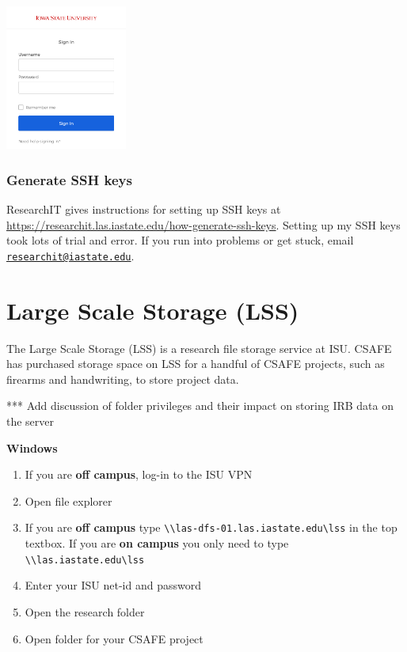 \documentclass[
]{book}
\providecommand{\tightlist}{%
  \setlength{\itemsep}{0pt}\setlength{\parskip}{0pt}}
\begin{document}
\begin{enumerate}
  \includegraphics[width=0.3\textwidth,height=0.3\textheight]{images/isu_login.png}
\end{enumerate}

\hypertarget{ssh-keys}{%
\subsection{Generate SSH keys}\label{ssh-keys}}

ResearchIT gives instructions for setting up SSH keys at \url{https://researchit.las.iastate.edu/how-generate-ssh-keys}. Setting up my SSH keys took lots of trial and error. If you run into problems or get stuck, email \href{mailto:researchit@iastate.edu}{\nolinkurl{researchit@iastate.edu}}.

\hypertarget{lss}{%
\chapter{Large Scale Storage (LSS)}\label{lss}}

The Large Scale Storage (LSS) is a research file storage service at ISU. CSAFE has purchased storage space on LSS for a handful of CSAFE projects, such as firearms and handwriting, to store project data.

*** Add discussion of folder privileges and their impact on storing IRB data on the server

\textbf{Windows}

\begin{enumerate}
\def\labelenumi{\arabic{enumi}.}
\tightlist
\item
  If you are \textbf{off campus}, log-in to the ISU VPN
\item
  Open file explorer
\item
  If you are \textbf{off campus} type \texttt{\textbackslash{}\textbackslash{}las-dfs-01.las.iastate.edu\textbackslash{}lss} in the top textbox. If you are \textbf{on campus} you only need to type \texttt{\textbackslash{}\textbackslash{}las.iastate.edu\textbackslash{}lss}
\item
  Enter your ISU net-id and password
\item
  Open the research folder
\item
  Open folder for your CSAFE project
\end{enumerate}
\end{document}
